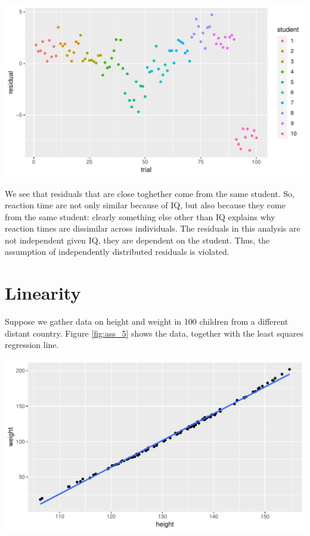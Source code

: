 \documentclass[]{report}\usepackage[]{graphicx}\usepackage[]{color}
\makeatletter
\def\maxwidth{ %
  \ifdim\Gin@nat@width>\linewidth
    \linewidth
  \else
    \Gin@nat@width
  \fi
}
\newenvironment{knitrout}{}{} %
\makeatother
\begin{document}
\begin{knitrout}
\color{fgcolor}

{\centering \includegraphics[width=\maxwidth]{figure/fig1415-1} 

}



\end{knitrout}

We see that residuals that are close toghether come from the same student. So, reaction time are not only similar because of IQ, but also because they come from the same student: clearly something else other than IQ explains why reaction times are dissimilar across individuals. The residuals in this analysis are not independent given IQ, they are dependent on the student. Thus, the assumption of independently distributed residuals is violated. 




\section{Linearity}

Suppose we gather data on height and weight in 100 children from a different distant country. Figure \ref{fig:ass_5} shows the data, together with the least squares regression line.

\begin{knitrout}
\color{fgcolor}

{\centering \includegraphics[width=\maxwidth]{figure/ass_5-1} 

}



\end{knitrout}
\end{document}
